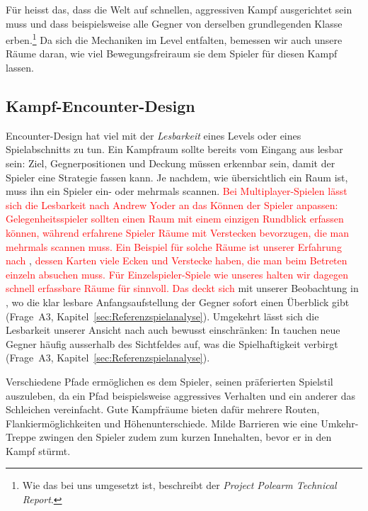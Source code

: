 \documentclass[../Main.tex]{subfiles}
\begin{document}
Für  heisst das, dass die Welt auf schnellen, aggressiven Kampf ausgerichtet sein muss und dass beispielsweise alle Gegner von derselben grundlegenden Klasse erben.\footnote{Wie das bei uns umgesetzt ist, beschreibt der \textit{Project Polearm Technical Report}.} Da sich die Mechaniken im Level entfalten, bemessen wir auch unsere Räume daran, wie viel Bewegungsfreiraum sie dem Spieler für diesen Kampf lassen.

\subsection{Kampf-Encounter-Design} \label{sec:Encounter}
Encounter-Design hat viel mit der \textit{Lesbarkeit} eines Levels oder eines Spielabschnitts zu tun. Ein Kampfraum sollte bereits vom Eingang aus lesbar sein: Ziel, Gegnerpositionen und Deckung müssen erkennbar sein, damit der Spieler eine Strategie fassen kann.\autocite{gdc_horizonquests2018} Je nachdem, wie übersichtlich ein Raum ist, muss ihn ein Spieler ein- oder mehrmals scannen. \textcolor{red}{Bei Multiplayer-Spielen lässt sich die Lesbarkeit nach Andrew Yoder an das Können der Spieler anpassen: Gelegenheitsspieler sollten einen Raum mit einem einzigen Rundblick erfassen können, während erfahrene Spieler Räume mit Verstecken bevorzugen, die man mehrmals scannen muss.}\autocite[122--123]{totten2014architectural} \textcolor{red}{Ein Beispiel für solche Räume ist unserer Erfahrung nach} ,\autocite{valve_counterstrike_2000} \textcolor{red}{dessen Karten viele Ecken und Verstecke haben, die man beim Betreten einzeln absuchen muss. Für Einzelspieler-Spiele wie unseres halten wir dagegen schnell erfassbare Räume für sinnvoll. Das deckt sich} mit unserer Beobachtung in , wo die klar lesbare Anfangsaufstellung der Gegner sofort einen Überblick gibt (Frage~A3, Kapitel~\ref{sec:Referenzspielanalyse}). Umgekehrt lässt sich die Lesbarkeit unserer Ansicht nach auch bewusst einschränken: In  tauchen neue Gegner häufig ausserhalb des Sichtfeldes auf, was die Spielhaftigkeit verbirgt (Frage~A3, Kapitel~\ref{sec:Referenzspielanalyse}).

Verschiedene Pfade ermöglichen es dem Spieler, seinen präferierten Spielstil auszuleben, da ein Pfad beispielsweise aggressives Verhalten und ein anderer das Schleichen vereinfacht.\autocite{gdc_tenprinciples2010} Gute Kampfräume bieten dafür mehrere Routen, Flankiermöglichkeiten und Höhenunterschiede. Milde Barrieren wie eine Umkehr-Treppe zwingen den Spieler zudem zum kurzen Innehalten, bevor er in den Kampf stürmt.\autocite{gdc_horizonquests2018}
\end{document}
